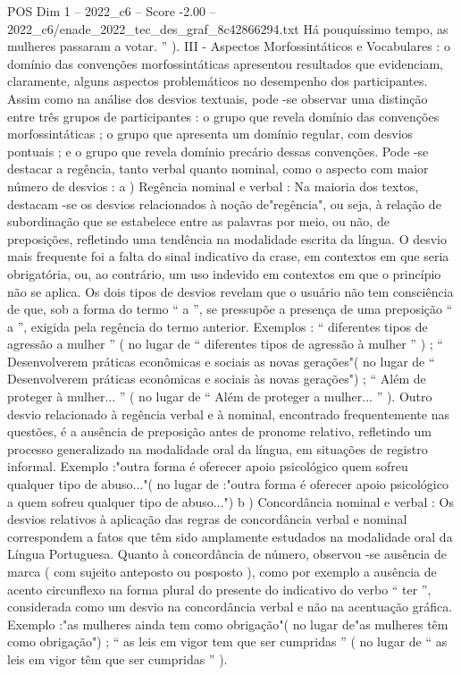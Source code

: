 \begin{textsample}{POS Dim 1 – 2022\_c6 – Score -2.00 – 2022\_c6/enade\_2022\_tec\_des\_graf\_8c42866294.txt}
Há pouquíssimo tempo, as mulheres passaram a votar. ” ).
III - Aspectos Morfossintáticos e Vocabulares : o domínio das convenções morfossintáticas apresentou resultados que evidenciam, claramente, alguns aspectos problemáticos no desempenho dos participantes.
Assim como na análise dos desvios textuais, pode -se observar uma distinção entre três grupos de participantes : o grupo que revela domínio das convenções morfossintáticas ; o grupo que apresenta um domínio regular, com desvios pontuais ; e o grupo que revela domínio precário dessas convenções.
Pode -se destacar a regência, tanto verbal quanto nominal, como o aspecto com maior número de desvios : a ) Regência nominal e verbal : Na maioria dos textos, destacam -se os desvios relacionados à noção de"regência", ou seja, à relação de subordinação que se estabelece entre as palavras por meio, ou não, de preposições, refletindo uma tendência na modalidade escrita da língua.
O desvio mais frequente foi a falta do sinal indicativo da crase, em contextos em que seria obrigatória, ou, ao contrário, um uso indevido em contextos em que o princípio não se aplica.
Os dois tipos de desvios revelam que o usuário não tem consciência de que, sob a forma do termo “ a ”, se pressupõe a presença de uma preposição “ a ”, exigida pela regência do termo anterior.
Exemplos : “ diferentes tipos de agressão a mulher ” ( no lugar de “ diferentes tipos de agressão à mulher ” ) ; “ Desenvolverem práticas econômicas e sociais as novas gerações"( no lugar de “ Desenvolverem práticas econômicas e sociais às novas gerações") ; “ Além de proteger à mulher... ” ( no lugar de “ Além de proteger a mulher... ” ).
Outro desvio relacionado à regência verbal e à nominal, encontrado frequentemente nas questões, é a ausência de preposição antes de pronome relativo, refletindo um processo generalizado na modalidade oral da língua, em situações de registro informal.
Exemplo :"outra forma é oferecer apoio psicológico quem sofreu qualquer tipo de abuso..."( no lugar de :"outra forma é oferecer apoio psicológico a quem sofreu qualquer tipo de abuso...") b ) Concordância nominal e verbal : Os desvios relativos à aplicação das regras de concordância verbal e nominal correspondem a fatos que têm sido amplamente estudados na modalidade oral da Língua Portuguesa.
Quanto à concordância de número, observou -se ausência de marca ( com sujeito anteposto ou posposto ), como por exemplo a ausência de acento circunflexo na forma plural do presente do indicativo do verbo “ ter ”, considerada como um desvio na concordância verbal e não na acentuação gráfica.
Exemplo :"as mulheres ainda tem como obrigação"( no lugar de"as mulheres têm como obrigação") ; “ as leis em vigor tem que ser cumpridas ” ( no lugar de “ as leis em vigor têm que ser cumpridas ” ).

\end{textsample}

